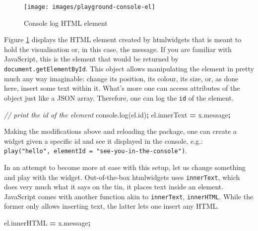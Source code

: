 \documentclass[10pt,]{krantz}
\makeatletter
\newenvironment{Shaded}{\begin{snugshade}}{\end{snugshade}}
\newcommand{\AttributeTok}[1]{\textcolor[rgb]{0.61,0.61,0.61}{#1}}
\newcommand{\CommentTok}[1]{\textcolor[rgb]{0.37,0.37,0.37}{\textit{#1}}}
\newcommand{\NormalTok}[1]{#1}
\newcommand{\OperatorTok}[1]{\textcolor[rgb]{0.43,0.43,0.43}{\textbf{#1}}}
\newcommand{\VariableTok}[1]{\textcolor[rgb]{0,0,0}{#1}}
\newenvironment{kframe}{%
\medskip{}
\setlength{\fboxsep}{.8em}
 \def\at@end@of@kframe{}%
 \ifinner\ifhmode%
  \def\at@end@of@kframe{\end{minipage}}%
  \begin{minipage}{\columnwidth}%
 \fi\fi%
 \def\FrameCommand##1{\hskip\@totalleftmargin \hskip-\fboxsep
 \colorbox{shadecolor}{##1}\hskip-\fboxsep
     \hskip-\linewidth \hskip-\@totalleftmargin \hskip\columnwidth}%
 \MakeFramed {\advance\hsize-\width
   \@totalleftmargin\z@ \linewidth\hsize
   \@setminipage}}%
 {\par\unskip\endMakeFramed%
 \at@end@of@kframe}
\renewenvironment{Shaded}{\begin{kframe}}{\end{kframe}}
\makeatother
\begin{document}
\begin{figure}[H]

{\centering \texttt{[image: images/playground-console-el]} 

}

\caption{Console log HTML element}\label{fig:playground-console-el}
\end{figure}

Figure \ref{fig:playground-console-el} displays the HTML element created by htmlwidgets that is meant to hold the visualisation or, in this case, the message. If you are familiar with JavaScript, this is the element that would be returned by \texttt{document.getElementById}. This object allows manipulating the element in pretty much any way imaginable: change its position, its colour, its size, or, as done here, insert some text within it. What's more one can access attributes of the object just like a JSON array. Therefore, one can log the \texttt{id} of the element.

\begin{Shaded}
\begin{Highlighting}[]
\CommentTok{// print the id of the element}
\VariableTok{console}\NormalTok{.}\AttributeTok{log}\NormalTok{(}\VariableTok{el}\NormalTok{.}\AttributeTok{id}\NormalTok{)}\OperatorTok{;}
\VariableTok{el}\NormalTok{.}\AttributeTok{innerText} \OperatorTok{=} \VariableTok{x}\NormalTok{.}\AttributeTok{message}\OperatorTok{;}
\end{Highlighting}
\end{Shaded}

Making the modifications above and reloading the package, one can create a widget given a specific id and see it displayed in the console, e.g.: \texttt{play("hello",\ elementId\ =\ "see-you-in-the-console")}.

In an attempt to become more at ease with this setup, let us change something and play with the widget. Out-of-the-box htmlwidgets uses \texttt{innerText}, which does very much what it says on the tin, it places text inside an element. JavaScript comes with another function akin to \texttt{innerText}, \texttt{innerHTML}. While the former only allows inserting text, the latter lets one insert any HTML.

\begin{Shaded}
\begin{Highlighting}[]
\VariableTok{el}\NormalTok{.}\AttributeTok{innerHTML} \OperatorTok{=} \VariableTok{x}\NormalTok{.}\AttributeTok{message}\OperatorTok{;}
\end{Highlighting}
\end{Shaded}
\end{document}
